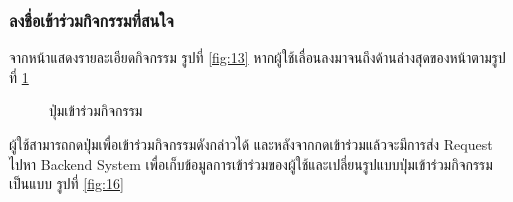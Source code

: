 \documentclass[14pt,oneside,openright,a4paper]{cpe-thai-project}
\begin{document}
\subsubsection{ลงชื่อเข้าร่วมกิจกรรมที่สนใจ}
จากหน้าแสดงรายละเอียดกิจกรรม รูปที่ \ref{fig:13} หากผู้ใช้เลื่อนลงมาจนถึงด้านล่างสุดของหน้าตามรูปที่  \ref{fig:15}
\begin{figure}[H]\centering
  \setlength{\fboxrule}{0.5mm}
  \setlength{\fboxsep}{0.5cm}
  \caption{ปุ่มเข้าร่วมกิจกรรม}\label{fig:15}
\end{figure}
ผู้ใช้สามารถกดปุ่มเพื่อเข้าร่วมกิจกรรมดังกล่าวได้ และหลังจากกดเข้าร่วมแล้วจะมีการส่ง Request ไปหา Backend System เพื่อเก็บข้อมูลการเข้าร่วมของผู้ใช้และเปลี่ยนรูปแบบปุ่มเข้าร่วมกิจกรรมเป็นแบบ รูปที่ \ref{fig:16} 
\end{document}
